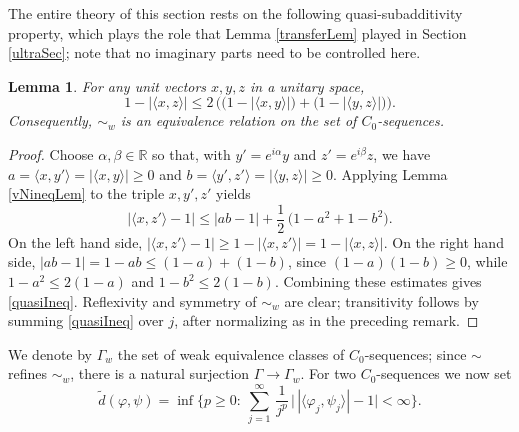\documentclass[twoside,11pt,letter]{article}
\def\bR{\mathbb{R}}
\theoremstyle{definition}
\theoremstyle{definition}
\theoremstyle{plain}
\newtheorem{lemma}[theorem]{Lemma}
\begin{document}
The entire theory of this section rests on the following quasi-subadditivity property, which plays the role that Lemma \ref{transferLem} played in Section \ref{ultraSec}; note that no imaginary parts need to be controlled here.

\begin{lemma}\label{quasiLem}
For any unit vectors $x,y,z$ in a unitary space,
\begin{equation}\label{quasiIneq}
1-|\langle x,z\rangle|\leq 2\,\Big(\big(1-|\langle x,y\rangle|\big)+\big(1-|\langle y,z\rangle|\big)\Big).
\end{equation}
Consequently, $\sim_w$ is an equivalence relation on the set of $C_0$-sequences.
\end{lemma}
\begin{proof}
Choose $\alpha,\beta\in\bR$ so that, with $y'=e^{i\alpha}y$ and $z'=e^{i\beta}z$, we have $a=\langle x,y'\rangle=|\langle x,y\rangle|\geq0$ and $b=\langle y',z'\rangle=|\langle y,z\rangle|\geq0$. Applying Lemma \ref{vNineqLem} to the triple $x,y',z'$ yields
\begin{equation*}
|\langle x,z'\rangle-1|\leq|ab-1|+\frac12\,\big(1-a^2+1-b^2\big).
\end{equation*}
On the left hand side, $|\langle x,z'\rangle-1|\geq1-|\langle x,z'\rangle|=1-|\langle x,z\rangle|$. On the right hand side, $|ab-1|=1-ab\leq(1-a)+(1-b)$, since $(1-a)(1-b)\geq0$, while $1-a^2\leq2(1-a)$ and $1-b^2\leq2(1-b)$. Combining these estimates gives \eqref{quasiIneq}. Reflexivity and symmetry of $\sim_w$ are clear; transitivity follows by summing \eqref{quasiIneq} over $j$, after normalizing as in the preceding remark.
\end{proof}

We denote by $\Gamma_w$ the set of weak equivalence classes of $C_0$-sequences; since $\sim$ refines $\sim_w$, there is a natural surjection $\Gamma\to\Gamma_w$. For two $C_0$-sequences we now set
\begin{equation}\label{tdDef}
\tilde d(\varphi,\psi)=\inf\Big\{p\geq 0:\:\sum _{j=1}^\infty\,\frac{1}{j^p}\,\big|\,|\langle \varphi_j,\psi_j\rangle|-1\big|<\infty\Big\}.
\end{equation}
\end{document}
